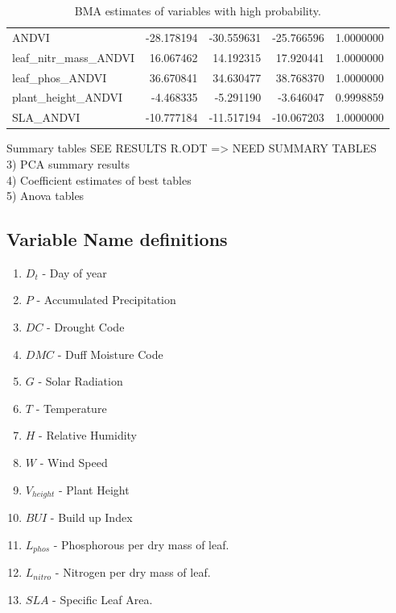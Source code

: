\documentclass[twocolumn,10pt]{article}
\begin{document}
\begin{table}[H]
\begin{tabular}{lrrrr}
ANDVI & -28.178194 & -30.559631 & -25.766596 & 1.0000000\\
\addlinespace
leaf\_nitr\_mass\_ANDVI & 16.067462 & 14.192315 & 17.920441 & 1.0000000\\
leaf\_phos\_ANDVI & 36.670841 & 34.630477 & 38.768370 & 1.0000000\\
plant\_height\_ANDVI & -4.468335 & -5.291190 & -3.646047 & 0.9998859\\
SLA\_ANDVI & -10.777184 & -11.517194 & -10.067203 & 1.0000000\\
\bottomrule
\end{tabular}
    \caption{BMA estimates of variables with high probability.} %
    \label{tab:unpooled}
\end{table}

Summary tables SEE RESULTS R.ODT => NEED SUMMARY TABLES \\
3) PCA summary results\\

4) Coefficient estimates of best tables\\


5) Anova tables\\



\subsection{Variable Name definitions} \label{varnames}%
\begin{enumerate}
    \item $D_{t}$ - Day of year
    \item $P$ - Accumulated Precipitation
    \item $DC$ - Drought Code
    \item $DMC$ - Duff Moisture Code
    \item $G$ - Solar Radiation
    \item $T$ - Temperature
    \item $H$ - Relative Humidity
    \item $W$ - Wind Speed
    \item $V_{height}$ - Plant Height
    \item $BUI$ - Build up Index
    \item $L_{phos}$ - Phosphorous per dry mass of leaf.
    \item $L_{nitro}$ - Nitrogen per dry mass of leaf.
    \item $SLA$ - Specific Leaf Area.
\end{enumerate}

\newpage

\end{document}
